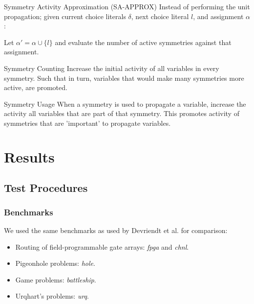 \documentclass{beamer}
\begin{document}
	\begin{frame}[allowframebreaks]
		\begin{block}{Symmetry Activity Approximation (SA-APPROX)}
			Instead of performing the unit propagation; given current choice literals $\delta$,
			next choice literal $l$, and assignment $\alpha$:

			Let $\alpha' = \alpha \cup \{l\}$ and evaluate the number of active symmetries against
			that assignment.
		\end{block}

		\begin{block}{Symmetry Counting}
			Increase the initial activity of all variables in every symmetry.
			Such that in turn, variables that would make many symmetries more active, are promoted.
		\end{block}

		\begin{block}{Symmetry Usage}
			When a symmetry is used to propagate a variable, increase the activity all variables
			that are part of that symmetry. This promotes activity of symmetries that are
			'important' to propagate variables.
		\end{block}
	\end{frame}


\section{Results}

	\subsection{Test Procedures}
	\begin{frame}
		\frametitle{Benchmarks}
		We used the same benchmarks as used by Devriendt et al. for comparison:
		\begin{itemize}
			\item Routing of field-programmable gate arrays: \emph{fpga} and \emph{chnl}.
			\item Pigeonhole problems: \emph{hole}.
			\item Game problems: \emph{battleship}.
			\item Urqhart's problems: \emph{urq}.
		\end{itemize}
	\end{frame}
\end{document}
